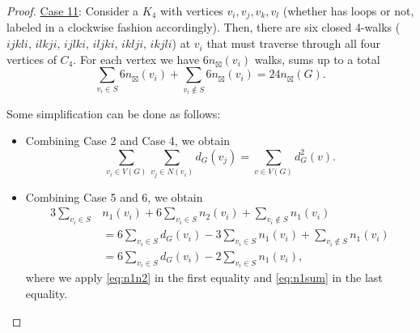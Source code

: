 \documentclass[12pt,a4paper,reqno]{amsart}
\numberwithin{equation}{section}
\theoremstyle{plain}
\theoremstyle{definition}
\newcommand{\<}{\langle}
\renewcommand{\>}{\rangle}
\begin{document}
\begin{proof}
\underline{Case 11}:
Consider a $K_4$ with vertices $v_i,v_j,v_k,v_l$ (whether has loops or not, labeled in a clockwise fashion accordingly). Then, there are six closed 4-walks ($ijkli$, $ilkji$, $ijlki$, $iljki$, $iklji$, $ikjli$) at $v_i$ that must traverse through all four vertices of $C_4.$ For each vertex we have $6 n_{\boxtimes}(v_i)$ walks, sums up to a total
    \begin{equation}
    \label{eq:obs5}
        \sum_{v_i\in S} 6n_{\boxtimes}(v_i) +  \sum_{v_i \notin S} 6n_{\boxtimes}(v_i) = 24 n_\boxtimes(G).
    \end{equation}


Some simplification can be done as follows:
\begin{itemize}
    \item Combining Case 2 and Case 4, we obtain
    \begin{equation}
    \label{eq:obs1}
    \sum_{v_i \in V(G)}\sum_{v_j \in N(v_i)}  d_G(v_j) = \sum_{v \in V(G)} d^2_G(v).
    \end{equation}
    
    \item Combining Case 5 and 6, we obtain 
    \begin{align}
    3 \sum_{v_i \in S} &n_1(v_i) + 6 \sum_{v_i \in S} n_2(v_i) + \sum_{v_i \notin S} n_1(v_i) \nonumber\\
    &= 6 \sum_{v_i \in S} d_G(v_i) - 3 \sum_{v_i \in S} n_1(v_i )+ \sum_{v_i \notin S} n_1(v_i) \nonumber\\
    &= 6 \sum_{v_i \in S} d_G(v_i) - 2 \sum_{v_i \in S} n_1(v_i ), \label{eq:obs2}
    \end{align}
    where we apply \eqref{eq:n1n2} in the first equality and \eqref{eq:n1sum} in the last equality.  
\end{itemize}


\end{proof}
\end{document}
